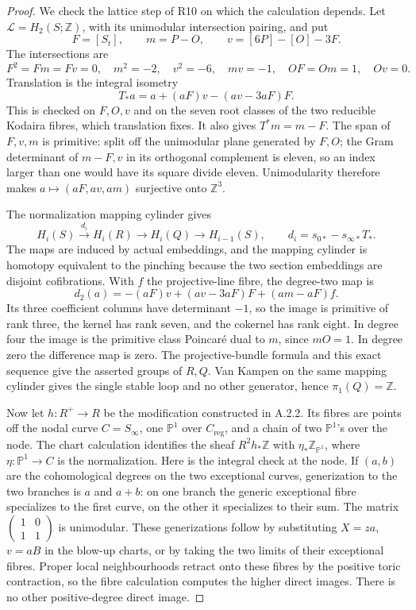 \begin{proof}
We check the lattice step of R10 on which the calculation depends.
Let $\mathcal L=H_2(S;\mathbb Z)$, with its unimodular intersection
pairing, and put
\[
 F=[S_t],\qquad m=P-O,\qquad v=[6P]-[O]-3F.
\]
The intersections are
\[
 F^2=Fm=Fv=0,\quad m^2=-2,\quad v^2=-6,\quad mv=-1,
 \quad OF=Om=1,\quad Ov=0.
\]
Translation is the integral isometry
\[
 T_*a=a+(aF)v-(av-3aF)F.
\]
This is checked on $F,O,v$ and on the seven root classes of
the two reducible Kodaira fibres, which translation fixes.
It also gives $T^*m=m-F$. The span of $F,v,m$ is primitive:
split off the unimodular plane generated by $F,O$; the Gram
determinant of $m-F,v$ in its orthogonal complement is eleven,
so an index larger than one would have its square divide eleven.
Unimodularity therefore makes
$a\mapsto(aF,av,am)$ surjective onto $\mathbb Z^3$.

The normalization mapping cylinder gives
\[
 H_i(S)\xrightarrow{d_i}H_i(R)\longrightarrow H_i(Q)
 \longrightarrow H_{i-1}(S),\qquad
 d_i=s_{0*}-s_{\infty*}T_*.
\]
The maps are induced by actual embeddings, and the mapping
cylinder is homotopy equivalent to the pinching because the
two section embeddings are disjoint cofibrations. With $f$ the
projective-line fibre, the degree-two map is
\[
 d_2(a)=-(aF)v+(av-3aF)F+(am-aF)f.
\]
Its three coefficient columns have determinant $-1$, so the
image is primitive of rank three, the kernel has rank seven,
and the cokernel has rank eight. In degree four the image is
the primitive class Poincar\'e dual to $m$, since $mO=1$.
In degree zero the difference map is zero. The projective-bundle
formula and this exact sequence give the asserted groups of
$R,Q$. Van Kampen on the same mapping cylinder gives the
single stable loop and no other generator, hence
$\pi_1(Q)=\mathbb Z$.

Now let $h:R^+\to R$ be the modification constructed in A.2.2.
Its fibres are points off the nodal curve $C=S_\infty$, one
$\mathbb P^1$ over $C_{\mathrm{reg}}$, and a chain of two
$\mathbb P^1$'s over the node. The chart calculation identifies
the sheaf $R^2h_*\mathbb Z$ with
$\eta_*\mathbb Z_{\mathbb P^1}$, where
$\eta:\mathbb P^1\to C$ is the normalization. Here is the
integral check at the node. If $(a,b)$ are the cohomological
degrees on the two exceptional curves, generization to the
two branches is $a$ and $a+b$: on one branch the generic
exceptional fibre specializes to the first curve, on the
other it specializes to their sum. The matrix
$\left(\begin{smallmatrix}1&0\\1&1\end{smallmatrix}\right)$
is unimodular. These generizations follow by substituting
$X=za$, $v=aB$ in the blow-up charts, or by taking the two
limits of their exceptional fibres. Proper local neighbourhoods
retract onto these fibres by the positive toric contraction,
so the fibre calculation computes the higher direct images.
There is no other positive-degree direct image.


\end{proof}
